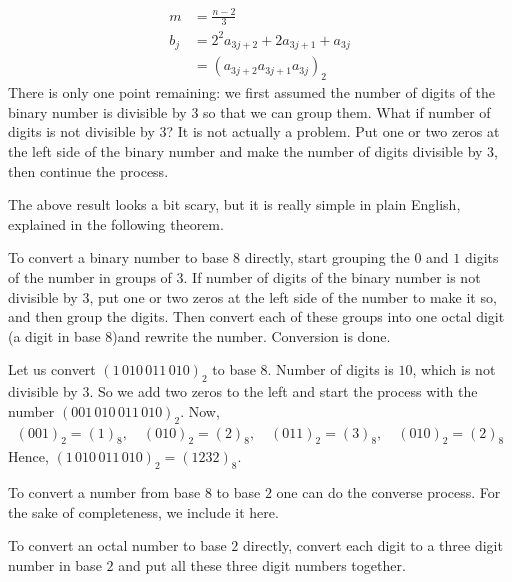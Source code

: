 \documentclass{subfile}
\begin{document}
	\begin{align*}
		m
			& =\frac{n-2}{3}\\
		b_j
			& = 2^2a_{3j+2} + 2a_{3j+1} + a_{3j}\\
			& = (a_{3j+2}a_{3j+1}a_{3j})_2
	\end{align*}
	There is only one point remaining: we first assumed the number of digits of the binary number is divisible by $3$ so that we can group them. What if number of digits is not divisible by $3$? It is not actually a problem. Put one or two zeros at the left side of the binary number and make the number of digits divisible by $3$, then continue the process.

	The above result looks a bit scary, but it is really simple in plain English, explained in the following theorem.

	\begin{theorem}
		To convert a binary number to base $8$ directly, start grouping the $0$ and $1$ digits of the number in groups of $3$. If number of digits of the binary number is not divisible by $3$, put one or two zeros at the left side of the number to make it so, and then group the digits. Then convert each of these groups into one octal digit (a digit in base $8$)and rewrite the number. Conversion is done.
	\end{theorem}

	\begin{example}
		Let us convert $({1\,010\,011\,010})_2$ to base $8$. Number of digits is $10$, which is not divisible by $3$. So we add two zeros to the left and start the process with the number $({001\,010\,011\,010})_2$. Now,
		\begin{align*}
			({001})_2 = (\textit{1})_8, \quad ({010})_2 = (\textit{2})_8,  \quad ({011})_2 = (\textit{3})_8, \quad ({010})_2 = (\textit{2})_8
		\end{align*}
		Hence, $({1\,010\,011\,010})_2 = ({1232})_8$.
	\end{example}
	To convert a number from base $8$ to base $2$ one can do the converse process. For the sake of completeness, we include it here.
	\begin{theorem}
		To convert an octal number to base $2$ directly, convert each digit to a three digit number in base $2$ and put all these three digit numbers together.
	\end{theorem}
\end{document}

